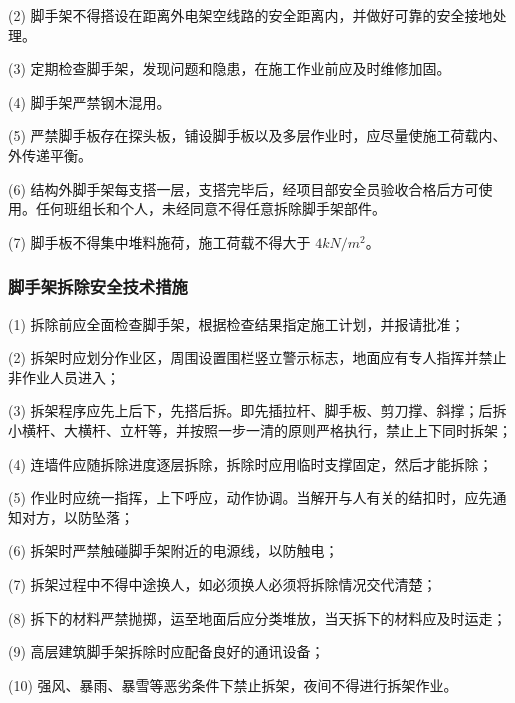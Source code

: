 (2) 脚手架不得搭设在距离外电架空线路的安全距离内，并做好可靠的安全接地处理。

(3) 定期检查脚手架，发现问题和隐患，在施工作业前应及时维修加固。

(4) 脚手架严禁钢木混用。

(5) 严禁脚手板存在探头板，铺设脚手板以及多层作业时，应尽量使施工荷载内、外传递平衡。

(6) 结构外脚手架每支搭一层，支搭完毕后，经项目部安全员验收合格后方可使用。任何班组长和个人，未经同意不得任意拆除脚手架部件。

(7) 脚手板不得集中堆料施荷，施工荷载不得大于 $4kN/m^2$。

\subsubsection{脚手架拆除安全技术措施}

(1) 拆除前应全面检查脚手架，根据检查结果指定施工计划，并报请批准；

(2) 拆架时应划分作业区，周围设置围栏竖立警示标志，地面应有专人指挥并禁止非作业人员进入；

(3) 拆架程序应先上后下，先搭后拆。即先插拉杆、脚手板、剪刀撑、斜撑；后拆小横杆、大横杆、立杆等，并按照一步一清的原则严格执行，禁止上下同时拆架；

(4) 连墙件应随拆除进度逐层拆除，拆除时应用临时支撑固定，然后才能拆除；

(5) 作业时应统一指挥，上下呼应，动作协调。当解开与人有关的结扣时，应先通知对方，以防坠落；

(6) 拆架时严禁触碰脚手架附近的电源线，以防触电；

(7) 拆架过程中不得中途换人，如必须换人必须将拆除情况交代清楚；

(8) 拆下的材料严禁抛掷，运至地面后应分类堆放，当天拆下的材料应及时运走；

(9) 高层建筑脚手架拆除时应配备良好的通讯设备；

(10) 强风、暴雨、暴雪等恶劣条件下禁止拆架，夜间不得进行拆架作业。